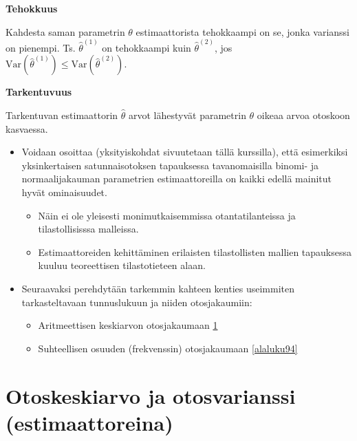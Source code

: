 \documentclass[
]{book}
\providecommand{\tightlist}{%
  \setlength{\itemsep}{0pt}\setlength{\parskip}{0pt}}
\begin{document}
\begin{defblock}{}
\textbf{Tehokkuus}

Kahdesta saman parametrin \(\theta\) estimaattorista tehokkaampi on se, jonka varianssi on pienempi. Ts. \(\widehat{\theta}^{(1)}\) on tehokkaampi kuin \(\widehat{\theta}^{(2)}\), jos \(\mathrm{Var}(\widehat{\theta}^{(1)}) \le \mathrm{Var}(\widehat{\theta}^{(2)})\).

\end{defblock}

\begin{defblock}{}
\textbf{Tarkentuvuus}

Tarkentuvan estimaattorin \(\widehat{\theta}\) arvot lähestyvät parametrin \(\theta\) oikeaa arvoa otoskoon kasvaessa.

\end{defblock}

\begin{itemize}
\tightlist
\item
  Voidaan osoittaa (yksityiskohdat sivuutetaan tällä kurssilla), että esimerkiksi yksinkertaisen satunnaisotoksen tapauksessa tavanomaisilla binomi- ja normaalijakauman parametrien estimaattoreilla on kaikki edellä mainitut hyvät ominaisuudet.

  \begin{itemize}
  \tightlist
  \item
    Näin ei ole yleisesti monimutkaisemmissa otantatilanteissa ja tilastollisisssa malleissa.
  \item
    Estimaattoreiden kehittäminen erilaisten tilastollisten mallien tapauksessa kuuluu teoreettisen tilastotieteen alaan.
  \end{itemize}
\item
  Seuraavaksi perehdytään tarkemmin kahteen kenties useimmiten tarkasteltavaan tunnuslukuun ja niiden otosjakaumiin:

  \begin{itemize}
  \tightlist
  \item
    Aritmeettisen keskiarvon otosjakaumaan \ref{alaluku93}
  \item
    Suhteellisen osuuden (frekvenssin) otosjakaumaan \ref{alaluku94}
  \end{itemize}
\end{itemize}

\hypertarget{alaluku93}{%
\section{Otoskeskiarvo ja otosvarianssi (estimaattoreina)}\label{alaluku93}}
\end{document}
